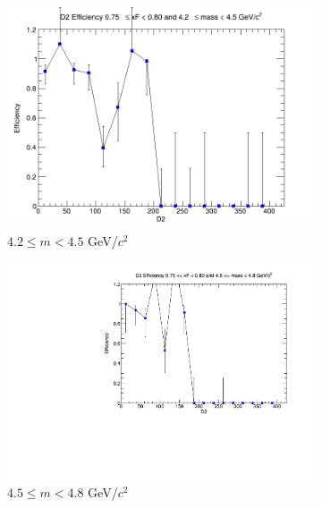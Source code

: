 \documentclass[11pt]{article}
\begin{document}
\begin{figure}[p]
    \centering
    \begin{subfigure}[b]{0.32\textwidth}
        \centering
        \includegraphics[width=\textwidth]{./kTrackerEfficiencyPlots/D2_Efficiency_xF15_mass0.png}
        \caption{$4.2 \leq m < 4.5$ GeV/$c^2$}
    \end{subfigure}\hfill
    \begin{subfigure}[b]{0.32\textwidth}
        \centering
        \includegraphics[width=\textwidth]{./kTrackerEfficiencyPlots/D2_Efficiency_xF15_mass1.pdf}
        \caption{$4.5 \leq m < 4.8$ GeV/$c^2$}
    \end{subfigure}\hfill
    \begin{subfigure}[b]{0.32\textwidth}
        \centering

\end{subfigure}
\end{figure}
\end{document}
